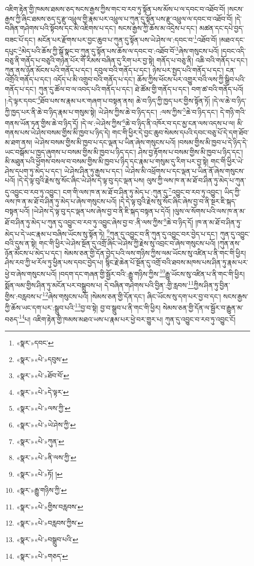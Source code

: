 འཇིག་རྟེན་གྱི་ཁམས་ཐམས་ཅད་སངས་རྒྱས་ཀྱིས་གང་བ་རབ་ཏུ་སྟོན་པས་མོས་པ་ལ་དབང་བ་འཐོབ་བོ། །སངས་རྒྱས་ཀྱི་ཞིང་ཐམས་ཅད་དུ་རྫུ་འཕྲུལ་གྱི་རྣམ་པར་འཕྲུལ་པ་ཀུན་དུ་སྟོན་པས་རྫུ་འཕྲུལ་ལ་དབང་བ་འཐོབ་བོ། །དེ་བཞིན་གཤེགས་པའི་སྟོབས་དང་མི་འཇིགས་པ་དང་། སངས་རྒྱས་ཀྱི་ཆོས་མ་འདྲེས་པ་དང་། མཚན་དང་དཔེ་བྱད་བཟང་པོ་དང་། མངོན་པར་རྫོགས་པར་བྱང་ཆུབ་པ་ཀུན་དུ་སྟོན་པས་ཡེ་ཤེས་ལ་:དབང་བ་\footnote{«སྣར་»དབང་}འཐོབ་བོ། །མཐའ་དང་དཔུང་\footnote{«སྣར་»«པེ་»དབུས་}མེད་པའི་ཆོས་ཀྱི་སྒོ་སྣང་བ་ཀུན་དུ་སྟོན་པས་ཆོས་ལ་དབང་བ་:འཐོབ་བོ་\footnote{«སྣར་»«པེ་»ཐོབ་བོ་}ཞེས་གསུངས་པའོ། །དབང་འདི་བཅུ་ནི་གནོད་པ་བཅུའི་གཉེན་པོར་གོ་རིམས་བཞིན་དུ་རིག་པར་བྱ་སྟེ། གནོད་པ་བཅུ་ནི། འཆི་བའི་གནོད་པ་དང་། ཀུན་ནས་ཉོན་མོངས་པའི་གནོད་པ་དང་། དབུལ་བའི་གནོད་པ་དང་། ཉེས་པར་སྤྱད་པའི་གནོད་པ་དང་། ངན་འགྲོའི་གནོད་པ་དང་། འདོད་པ་མི་འགྲུབ་བའི་གནོད་པ་དང་། ཆོས་ཀྱིས་ཕོངས་པར་འགྱུར་བའི་ལས་ཀྱི་སྒྲིབ་པའི་གནོད་པ་དང་། ཀུན་དུ་ཚོལ་བ་ལ་འབད་པའི་གནོད་པ་དང་། ཐེ་ཚོམ་གྱི་གནོད་པ་དང་། བག་ཚ་བའི་གནོད་པའོ། །:དེ་ལྟར་དབང་\footnote{«སྣར་»«པེ་»དེ་ལྟར་}ཐོབ་པས་ས་རྣམ་པར་གཞག་པ་བསྟན་ནས། ཆེ་བ་ཉིད་ཀྱི་ཁྱད་པར་གྱིས་སྟོན་ཏོ། །དེ་ལ་ཆེ་བ་ཉིད་ཀྱི་ཁྱད་པར་ནི་ཆེ་བ་ཉིད་རྣམ་པ་གསུམ་སྟེ། ཡེ་ཤེས་ཀྱིས་ཆེ་བ་ཉིད་དང་། :ལས་ཀྱིས་\footnote{«སྣར་»«པེ་»ལས་ཀྱི་}ཆེ་བ་ཉིད་དང་། དེ་གཉི་གའི་གནས་ཡོན་ཏན་གྱིས་ཆེ་བ་ཉིད་དོ། །དེ་ལ་:ཡེ་ཤེས་ཀྱིས་\footnote{«སྣར་»«པེ་»ཡེ་ཤེས་ཀྱི་}ཆེ་བ་ཉིད་ནི་འཁོར་བ་དང་མྱ་ངན་ལས་འདས་པ་ལ། མི་གནས་པས་ཡེ་ཤེས་བསམ་གྱིས་མི་ཁྱབ་པ་ཉིད་དེ། གང་གི་ཕྱིར་དེ་བྱང་ཆུབ་སེམས་དཔའི་དབང་བཅུ་པོ་དེ་དག་ཐོབ་མ་ཐག་ནས། ཡེ་ཤེས་བསམ་གྱིས་མི་ཁྱབ་པ་དང་ལྡན་པ་ཡིན་ཞེས་གསུངས་པའོ། །བསམ་གྱིས་མི་ཁྱབ་པ་དེ་ཉིད་དེ་ཡང་བསྒོམ་པ་ཁྱད་ཞུགས་པ་བསམ་གྱིས་མི་ཁྱབ་པ་ཉིད་དང་། ཤེས་བྱ་རྟོགས་པ་བསམ་གྱིས་མི་ཁྱབ་པ་ཉིད་དང་། མི་མཐུན་པའི་ཕྱོགས་བསལ་བ་བསམ་གྱིས་མི་ཁྱབ་པ་ཉིད་དང་རྣམ་པ་གསུམ་དུ་རིག་པར་བྱ་སྟེ། གང་གི་ཕྱིར་ཡེ་ཤེས་དཔག་ཏུ་མེད་པ་དང་། ཡེ་ཤེས་ཤིན་ཏུ་རྒྱས་པ་དང་། ཡེ་ཤེས་མི་འཕྲོགས་པ་དང་ལྡན་པ་ཡིན་ནོ་ཞེས་གསུངས་པའོ། །དེ་དེ་ལྟ་བུའི་རྗེས་སུ་སོང་ཞིང་ཡེ་ཤེས་དེ་ལྟ་བུ་དང་ལྡན་པས། ལུས་ཀྱི་ལས་ཁ་ན་མ་ཐོ་བ་ཤིན་ཏུ་མེད་པ་ཀུན་དུ་འབྱུང་བ་རབ་ཏུ་འབྱུང་། ངག་གི་ལས་ཁ་ན་མ་ཐོ་བ་ཤིན་ཏུ་མེད་པ་:ཀུན་དུ་\footnote{«སྣར་»«པེ་»ཀུན་}འབྱུང་བ་རབ་ཏུ་འབྱུང་། ཡིད་ཀྱི་ལས་ཁ་ན་མ་ཐོ་བ་ཤིན་ཏུ་མེད་པ་ཞེས་གསུངས་པའོ། །དེ་དེ་ལྟ་བུའི་རྗེས་སུ་སོང་ཞིང་ཞེས་བྱ་བ་ནི་སྔར་ཇི་སྐད་བསྟན་པའོ། །ཡེ་ཤེས་དེ་ལྟ་བུ་དང་ལྡན་པས་ཞེས་བྱ་བ་ནི་ཇི་སྐད་བསྟན་པ་དེའོ། །ལུས་ལ་སོགས་པའི་ལས་ཁ་ན་མ་ཐོ་བ་ཤིན་ཏུ་མེད་པ་ཀུན་དུ་འབྱུང་བ་རབ་ཏུ་འབྱུང་ཞེས་བྱ་བ་:ནི་ལས་ཀྱིས་\footnote{«སྣར་»«པེ་»ནི་ལས་ཀྱི་}ཆེ་བ་ཉིད་དོ། །ཁ་ན་མ་ཐོ་བ་ཤིན་ཏུ་མེད་པ་དེ་ཡང་རྣམ་པ་བཞིས་ཡོངས་སུ་སྟོན་ཏེ། \footnote{«སྣར་»«པེ་»ཏོ། ། }ཀུན་དུ་འབྱུང་བ་ནི་ཀུན་དུ་འབྱུང་བར་བྱེད་པ་དང་། ཀུན་དུ་འབྱུང་བའི་དུས་ན་སྟེ། གང་གི་ཕྱིར་ཡེ་ཤེས་སྔོན་དུ་འགྲོ་ཞིང་ཡེ་ཤེས་ཀྱི་རྗེས་སུ་འབྲང་བ་ཞེས་གསུངས་པའོ། །ཀུན་ནས་ཉོན་མོངས་པ་མེད་པ་དང་། སེམས་ཅན་གྱི་དོན་བྱེད་པའི་ལས་གཉིས་ཀྱིས་ལམ་ཡོངས་སུ་འཛིན་པ་ནི་གང་གི་ཕྱིར། ཤེས་རབ་ཀྱི་ཕ་རོལ་ཏུ་ཕྱིན་པས་དབང་བྱེད་པ། སྙིང་རྗེ་ཆེན་པོ་སྔོན་དུ་འགྲོ་བའི་ཐབས་མཁས་པས་ཤིན་ཏུ་རྣམ་པར་ཕྱེ་བ་ཞེས་གསུངས་པའོ། །བདག་དང་གཞན་གྱི་སྦྱོར་བའི་:རྒྱུ་གཉིས་ཀྱིས་\footnote{«སྣར་»རྒྱུ་གཉིས་ཀྱི་}རྒྱུ་ཡོངས་སུ་འཛིན་པ་ནི་གང་གི་ཕྱིར། སྨོན་ལམ་གྱིས་ཤིན་ཏུ་མངོན་པར་བསྒྲུབས་པ། དེ་བཞིན་གཤེགས་པའི་བྱིན་:གྱི་རླབས་\footnote{«སྣར་»«པེ་»གྱིས་བརླབས་}ཀྱིས་ཤིན་ཏུ་བྱིན་གྱིས་:བརླབས་པ་\footnote{«སྣར་»«པེ་»བརླབས་ཀྱིས་}ཞེས་གསུངས་པའོ། །སེམས་ཅན་གྱི་དོན་དང་། ཞིང་ཡོངས་སུ་དག་པར་བྱ་བ་དང་། སངས་རྒྱས་ཀྱི་ཆོས་ཡང་དག་པར་:སྒྲུབ་པའི་\footnote{«སྣར་»«པེ་»བསྒྲུབ་པའི་}བྱ་བ་སྟེ། བྱ་བ་སྒྲུབ་པ་ནི་གང་གི་ཕྱིར། སེམས་ཅན་གྱི་དོན་ལ་སྦྱོར་བ་རྒྱུན་མ་བཅད་\footnote{«སྣར་»«པེ་»གཅད་}པ། འཇིག་རྟེན་གྱི་ཁམས་མཐའ་ཡས་པ་རྣམ་པར་ཕྱེ་བར་གྱུར་པ། ཀུན་དུ་འབྱུང་བ་རབ་ཏུ་འབྱུང་ངོ། 